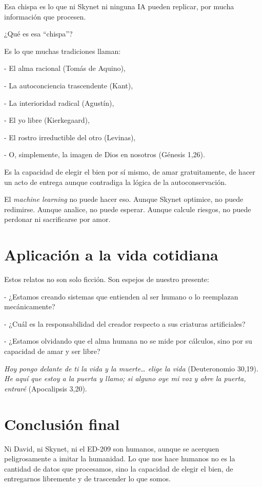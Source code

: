 \documentclass[12pt]{article}
\begin{document}
	Esa chispa es lo que ni Skynet ni ninguna IA pueden replicar, por mucha información que procesen.
	
	¿Qué es esa ``chispa''?
	
	Es lo que muchas tradiciones llaman:
	
	
	- El alma racional (Tomás de Aquino),
	
	- La autoconciencia trascendente (Kant),
	
	- La interioridad radical (Agustín),
	
	- El yo libre (Kierkegaard),
	
	- El rostro irreductible del otro (Levinas),
	
	- O, simplemente, la imagen de Dios en nosotros (Génesis 1,26).
	
	
	Es la capacidad de elegir el bien por sí mismo, de amar gratuitamente, de hacer un acto de entrega aunque contradiga la lógica de la autoconservación.
	
	El \textit{machine learning} no puede hacer eso.  
	Aunque Skynet optimice, no puede redimirse.  
	Aunque analice, no puede esperar.  
	Aunque calcule riesgos, no puede perdonar ni sacrificarse por amor.
	
	\section{Aplicación a la vida cotidiana}
	Estos relatos no son solo ficción. Son espejos de nuestro presente:	
	
	- ¿Estamos creando sistemas que entienden al ser humano o lo reemplazan mecánicamente?
	
	- ¿Cuál es la responsabilidad del creador respecto a sus criaturas artificiales?
	
	- ¿Estamos olvidando que el alma humana no se mide por cálculos, sino por su capacidad de amar y ser libre?
	
	
	\begin{displayquote}
		\textit{Hoy pongo delante de ti la vida y la muerte… elige la vida} (Deuteronomio 30,19).  
		\textit{He aquí que estoy a la puerta y llamo; si alguno oye mi voz y abre la puerta, entraré} (Apocalipsis 3,20).
	\end{displayquote}
	
	\section{Conclusión final}
	Ni David, ni Skynet, ni el ED-209 son humanos, aunque se acerquen peligrosamente a imitar la humanidad. Lo que nos hace humanos no es la cantidad de datos que procesamos, sino la capacidad de elegir el bien, de entregarnos libremente y de trascender lo que somos.
	
\end{document}
